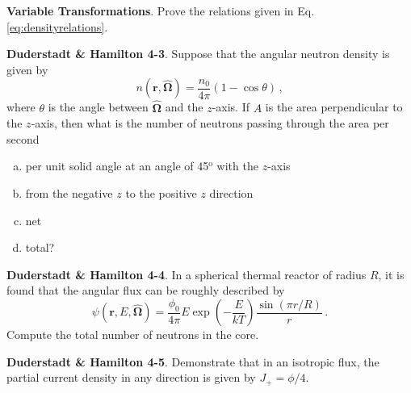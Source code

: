 \begin{exercises}
 
  \item \textbf{Variable Transformations}. 
        Prove the relations given in Eq. \ref{eq:densityrelations}.


  \item \textbf{Duderstadt \& Hamilton 4-3}. Suppose that the angular neutron 
        density is given by 
        \begin{equation*}
          n(\mathbf{r},\hat{\bm{\Omega}}) = \frac{n_0}{4\pi} (1-\cos\theta) \, ,
        \end{equation*}
        where $\theta$ is the angle between $\hat{\bm{\Omega}}$ and the 
        $z$-axis. If $A$ is the area perpendicular to the $z$-axis, then 
        what is the number of neutrons passing through the area 
        per second
        \begin{enumerate}[(a)]
         \item per unit solid angle at an angle of 45$^{\text{o}}$ with 
               the $z$-axis
         \item from the negative $z$ to the positive $z$ direction
         \item net 
         \item total?
        \end{enumerate}

  \item \textbf{Duderstadt \& Hamilton 4-4}. In a spherical thermal reactor of 
        radius $R$, it is found that the angular flux can be roughly 
        described by 
        \begin{equation*}
         \psi(\mathbf{r}, E, \hat{\bm{\Omega}}) 
          = \frac{\phi_0}{4\pi} E \exp \left ( -\frac{E}{kT} \right ) \frac{\sin(\pi r/R)}{r} \, .
        \end{equation*}
        Compute the total number of neutrons in the core.

  \item \textbf{Duderstadt \& Hamilton 4-5}. Demonstrate that in an 
        isotropic flux, the partial current density in any direction is
        given by $J_+ = \phi / 4$.


\end{exercises}
